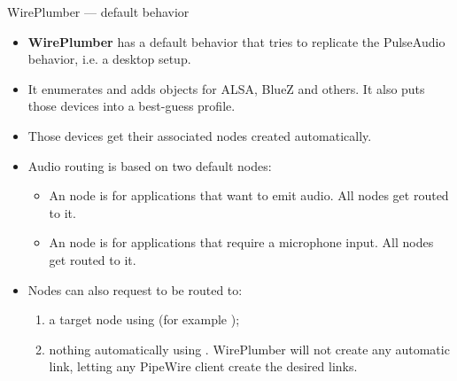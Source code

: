 \begin{frame}{WirePlumber — default behavior}
  \begin{itemize}

  \item \textbf{WirePlumber} has a default behavior that tries to
    replicate the PulseAudio behavior, i.e. a desktop setup.

  \item It enumerates and adds  objects for ALSA, BlueZ
    and others. It also puts those devices into a best-guess profile.

  \item Those devices get their associated nodes created automatically.

  \item Audio routing is based on two default nodes:

    \begin{itemize}
    \item An  node is for applications that want to
      emit audio. All  nodes get routed to it.
    \item An  node is for applications that require a
      microphone input. All  nodes get routed to it.
    \end{itemize}

  \item Nodes can also request to be routed to:

    \begin{enumerate}
    \item a target node using  (for example
      );
    \item nothing automatically using .
      WirePlumber will not create any automatic link, letting any
      PipeWire client create the desired links.
    \end{enumerate}

  \end{itemize}
\end{frame}



